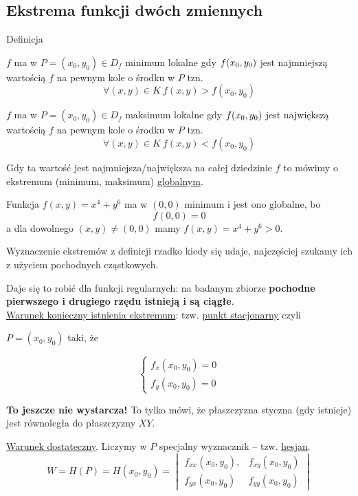 \subsection{Ekstrema funkcji dwóch zmiennych}

\begin{tw}{Definicja}

$f$ ma w $ P = (x_0, y_0) \in D_f $ minimum lokalne gdy $ f(x_0, y_0) $ jest najmniejszą wartością $f$ na pewnym kole o środku w $P$ tzn.
\[ \forall(x,y) \in K \ f(x,y) > f(x_0, y_0) \]

$f$ ma w $ P = (x_0, y_0) \in D_f $ maksimum lokalne gdy $ f(x_0, y_0) $ jest największą wartością $f$ na pewnym kole o środku w $P$ tzn.
\[ \forall(x,y) \in K \ f(x,y) < f(x_0, y_0) \]

Gdy ta wartość jest najmniejsza/największa na całej dziedzinie $f$ to mówimy o ekstremum (minimum, maksimum) \underline{globalnym}.
\end{tw}

\begin{przyklad}
Funkcja $ f(x,y) = x^4 + y^6 $ ma w $(0,0)$ minimum i jest ono globalne, bo
$$ f(0,0) = 0 $$
a dla dowolnego $ (x,y) \neq (0,0) $ mamy $ f(x,y) = x^4 + y^6 > 0 $.
\end{przyklad}

Wyznaczenie ekstremów z definicji rzadko kiedy się udaje, najczęściej szukamy ich z użyciem pochodnych cząstkowych.

Daje się to robić dla funkcji regularnych: na badanym zbiorze \textbf{pochodne pierwszego i drugiego rzędu istnieją i są ciągłe}. \\

\underline{Warunek konieczny istnienia ekstremum}: tzw. \underline{punkt stacjonarny} czyli

$ P = (x_0, y_0) $ taki, że 

$$ \left\{ \begin{aligned} f_x(x_0, y_0) = 0 \\ f_y(x_0, y_0) = 0  \end{aligned} \right. $$

\textbf{To jeszcze nie wystarcza!} To tylko mówi, że płaszczyzna styczna (gdy istnieje) jest równoległa do płaszczyzny $XY$.

\underline{Warunek dostateczny}. Liczymy w $P$ specjalny wyznacznik -- tzw. \underline{hesjan}.
$$ W = H(P) = H(x_0, y_0) = \begin{vmatrix} f_{xx}(x_0, y_0), & f_{xy}(x_0, y_0) \\ f_{yx}(x_0, y_0) & f_{yy}(x_0, y_0) \end{vmatrix} $$

